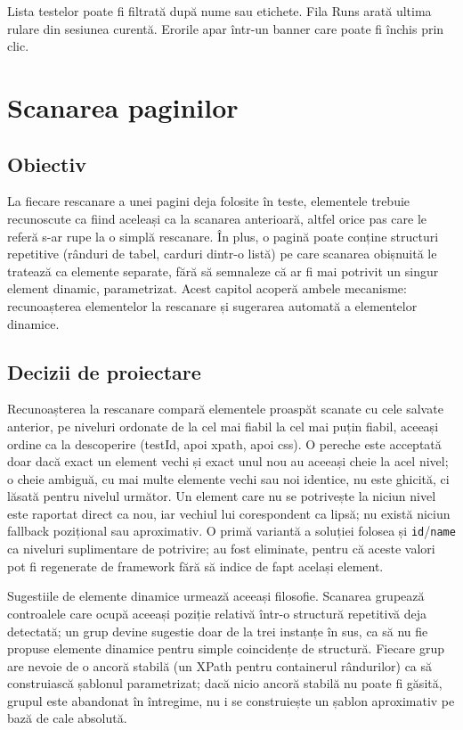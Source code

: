 \documentclass[12pt,a4paper]{report}
\newcommand{\File}[1]{\nolinkurl{#1}}
\begin{document}
Lista testelor poate fi filtrată după nume sau etichete. Fila Runs arată ultima rulare din sesiunea curentă. Erorile apar într-un banner care poate fi închis prin clic.

\chapter{Scanarea paginilor}

\section{Obiectiv}

La fiecare rescanare a unei pagini deja folosite în teste, elementele trebuie recunoscute ca fiind aceleași ca la scanarea anterioară, altfel orice pas care le referă s-ar rupe la o simplă rescanare. În plus, o pagină poate conține structuri repetitive (rânduri de tabel, carduri dintr-o listă) pe care scanarea obișnuită le tratează ca elemente separate, fără să semnaleze că ar fi mai potrivit un singur element dinamic, parametrizat. Acest capitol acoperă ambele mecanisme: recunoașterea elementelor la rescanare și sugerarea automată a elementelor dinamice.

\section{Decizii de proiectare}

Recunoașterea la rescanare compară elementele proaspăt scanate cu cele salvate anterior, pe niveluri ordonate de la cel mai fiabil la cel mai puțin fiabil, aceeași ordine ca la descoperire (testId, apoi xpath, apoi css). O pereche este acceptată doar dacă exact un element vechi și exact unul nou au aceeași cheie la acel nivel; o cheie ambiguă, cu mai multe elemente vechi sau noi identice, nu este ghicită, ci lăsată pentru nivelul următor. Un element care nu se potrivește la niciun nivel este raportat direct ca nou, iar vechiul lui corespondent ca lipsă; nu există niciun fallback pozițional sau aproximativ. O primă variantă a soluției folosea și \File{id}/\File{name} ca niveluri suplimentare de potrivire; au fost eliminate, pentru că aceste valori pot fi regenerate de framework fără să indice de fapt același element.

Sugestiile de elemente dinamice urmează aceeași filosofie. Scanarea grupează controalele care ocupă aceeași poziție relativă într-o structură repetitivă deja detectată; un grup devine sugestie doar de la trei instanțe în sus, ca să nu fie propuse elemente dinamice pentru simple coincidențe de structură. Fiecare grup are nevoie de o ancoră stabilă (un XPath pentru containerul rândurilor) ca să construiască șablonul parametrizat; dacă nicio ancoră stabilă nu poate fi găsită, grupul este abandonat în întregime, nu i se construiește un șablon aproximativ pe bază de cale absolută.
\end{document}
